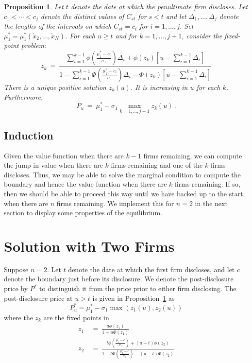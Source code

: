 \documentclass[ecta,nameyear,draft]{econsocart}
\theoremstyle{theorem}
\newtheorem{proposition}{Proposition}
\numberwithin{lemma}{section}
\numberwithin{proposition}{section}
\numberwithin{equation}{section}
\numberwithin{figure}{section}
\begin{document}
\begin{proposition}\label{prop:last}
Let $t$ denote the date at which the penultimate firm discloses.  Let $c_1< \cdots < c_j$ denote the distinct values of $C_{st}$ for $s<t$ and let $\Delta_1,\ldots, \Delta_j$ denote the lengths of the intervals on which $C_{st}=c_i$ for $i=1,\ldots,j$.
Set $\mu^*_1 = \mu^*_1(\tilde x_2,\ldots,\tilde x_N)$.  For each $u\ge t$ and for $k=1,\ldots, j+1$, consider the fixed-point problem:
\begin{equation}
z_k \ = \ \frac{\sum_{i=1}^{k-1} \phi\left(\frac{\mu^*_1-c_i}{\sigma_{1}}\right)\Delta_i + \phi(z_k)\left[u- \sum_{i=1}^{k-1}\Delta_i\right]}
{1 - \sum_{i=1}^{k-1} \Phi\left(\frac{\mu^*_{1}-c_i}{\sigma_{1}}\right)\Delta_i - \Phi(z_k)\left[u- \sum_{i=1}^{k-1}\Delta_i\right]}
\end{equation} 
There is a unique positive solution $z_k(u)$.  It is increasing in $u$ for each $k$.  Furthermore, 
\begin{equation}
P_u  \ = \ \mu_1^* - \sigma_1 \max_{k=1,\ldots,j+1}z_k(u)\,.
\end{equation}
\end{proposition}

\subsection{Induction}

Given the value function when there are $k-1$ firms remaining, we can compute the jump in value when there are $k$ firms remaining and one of the $k$ firms discloses.  Thus, we may be able to solve the marginal condition to compute the boundary and hence the value function when there are $k$ firms remaining.  If so, then we should be able to proceed this way until we have backed up to the start when there are $n$ firms remaining.  We implement this for $n=2$ in the next section to display some properties of the equilibrium.  

\section{Solution with Two Firms}

Suppose $n=2$.  Let $t$ denote the date at which the first firm discloses, and let $c$ denote the boundary just before its disclosure.  We denote the post-disclosure price by $P^*$ to distinguish it from the price prior to either firm disclosing.  The post-disclosure price at $u>t$ is given in Proposition~\ref{prop:last} as
\begin{equation}\label{price:last}
    P^*_u = \mu_1^* - \sigma_1 \max(z_1(u), z_2(u))
\end{equation}
where the $z_k$ are the fixed points in
\begin{align}
z_1 \ &= \ \frac{u\phi(z_1)}{1 - u\Phi(z_1)}\\
z_2 \ &= \ \frac{ t\phi\left(\frac{\mu^*_1-c}{\sigma_{1}}\right)+ (u-t)\phi(z_2)}
{1 - t\Phi\left(\frac{\mu^*_{1}-c}{\sigma_{1}}\right) - (u-t)\Phi(z_2)}
\end{align}
\end{document}
